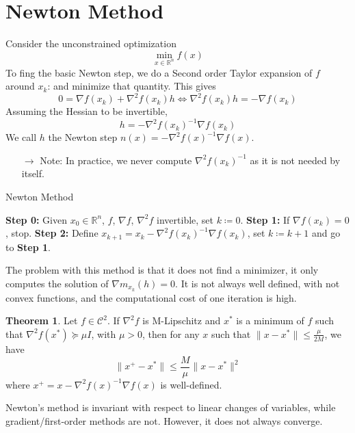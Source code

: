 \documentclass[12pt, openany]{report}
\newcommand{\R}{\mathbb{R}}
\theoremstyle{definition}
\newtheorem{thm}{Theorem}[chapter]
\begin{document}
\section{Newton Method}
Consider the unconstrained optimization 
\begin{equation}
    \min_{x\in \R^n} f(x)
\end{equation}
To fing the basic Newton step, we do a Second order Taylor expansion of \(f\) around \(x_k\): and minimize that quantity. This gives 
\begin{equation}
    0 = \nabla f(x_k) + \nabla^2f(x_k)h \Longleftrightarrow \nabla^2f(x_k)h = -\nabla f(x_k)
\end{equation}
Assuming the Hessian to be invertible, 
\begin{equation}
    h = -\nabla^2f(x_k)^{-1}\nabla f(x_k)
\end{equation}
We call $h$ the Newton step $n(x) = -\nabla^2f(x)^{-1}\nabla f(x)$. 
\begin{itemize}
    \item [\(\rightarrow\)] Note: In practice, we never compute $\nabla^2f(x_k)^{-1}$ as it is not needed by itself.
\end{itemize}
\begin{algorithm}
    \caption{Newton Method}\label{algo:newton}
    \begin{algorithmic}[1]
        \State \textbf{Step 0:} Given $x_0\in \R^n$, $f$, $\nabla f$, $\nabla^2f$ invertible, set $k\coloneqq 0$.
        \State \textbf{Step 1:} If $\nabla f(x_k)=0$, stop.
        \State \textbf{Step 2:} Define $x_{k+1}=x_k - \nabla^2f(x_k)^{-1}\nabla f(x_k)$, set $k\coloneqq k+1$ and go to \textbf{Step 1}.
    \end{algorithmic}
\end{algorithm}
The problem with this method is that it does not find a minimizer, it only computes the solution of $\nabla m_{x_k}(h)=0$. It is not always well defined, with not convex functions, and the computational cost of one iteration is high. 
\begin{thm}
    Let $f\in \mathcal{C}^2$. If $\nabla^2f$ is M-Lipschitz and $x^*$ is a minimum of $f$ such that $\nabla^2f(x^*)\succeq \mu I$, with $\mu>0$, then for any $x$ such that $\lVert x-x^*\rVert\le \frac{\mu}{2M}$, we have
    \begin{equation}
        \lVert x^+-x^*\rVert \le \frac{M}{\mu}\lVert x-x^*\rVert^2
    \end{equation}
    where $x^+ = x - \nabla^2f(x)^{-1}\nabla f(x)$ is well-defined.
\end{thm}
Newton's method is invariant with respect to linear changes of variables, while gradient/first-order methods are not. However, it does not always converge. 
\end{document}
